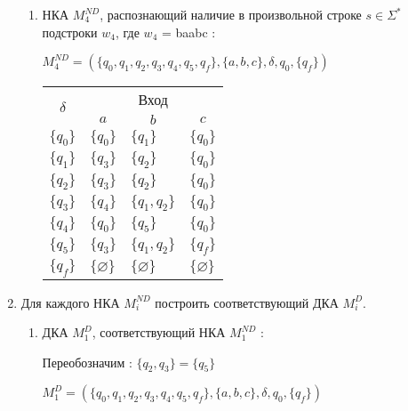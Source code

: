 \begin{enumerate}[label=(\roman{*})]
\begin{enumerate}
		\item НКА $M^{ND}_4$, распознающий наличие в произвольной строке $s \in \Sigma^*$ подстроки $w_4$, где $w_4$ = baabc :
		
		$M^{ND}_4 = (\{q_0, q_1, q_2, q_3, q_4, q_5, q_f\}, \{a, b, c\}, \delta, q_0, \{q_f\})$
		
		\begin{center}
			\begin{tabular}{llll}
				\toprule
				\multicolumn{1}{c}{\multirow{2}{*}{\Large $\delta$}}
				& \multicolumn{3}{c}{Вход} \\
				\cmidrule(rl){2-4}
				& \multicolumn{1}{c}{$a$}
				& \multicolumn{1}{c}{$b$} 
				& \multicolumn{1}{c}{$c$} \\
				\midrule
				$\{q_0\}$       & $\{q_0\}$      		 & $\{q_1\}$     &$\{q_0\}$  \\
				$\{q_1\}$       & $\{q_3\}$    			 & $\{q_2\}$     &$\{q_0\}$ \\
				$\{q_2\}$       & $\{q_3\}$    			 & $\{q_2\}$     &$\{q_0\}$  \\
				$\{q_3\}$       & $\{q_4\}$    			 & $\{q_1, q_2\}$     &$\{q_0\}$  \\
				$\{q_4\}$       & $\{q_0\}$    			 & $\{q_5\}$     &$\{q_0\}$  \\
				$\{q_5\}$       & $\{q_3\}$    			 & $\{q_1, q_2\}$     &$\{q_f\}$  \\
				$\{q_f\}$       & $\{\varnothing\}$    	 & $\{\varnothing\}$     &$\{\varnothing\}$  \\
				\bottomrule
			\end{tabular}
		\end{center}
		
	\end{enumerate}

	
	\item Для каждого НКА $M^{ND}_i$ построить соответствующий ДКА $M^D_i$.
		
	\begin{enumerate}
		
		\item ДКА $M^{D}_1$, соответствующий НКА  $M^{ND}_1$ :
		\newline
		
		Переобозначим : $\{q_2, q_3\} = \{q_5\}$ 
		\newline 
		
		$M^{D}_1 = (\{q_0, q_1, q_2, q_3, q_4, q_5, q_f\}, \{a, b, c\}, \delta, q_0, \{q_f\})$
		

\end{enumerate}
\end{enumerate}
